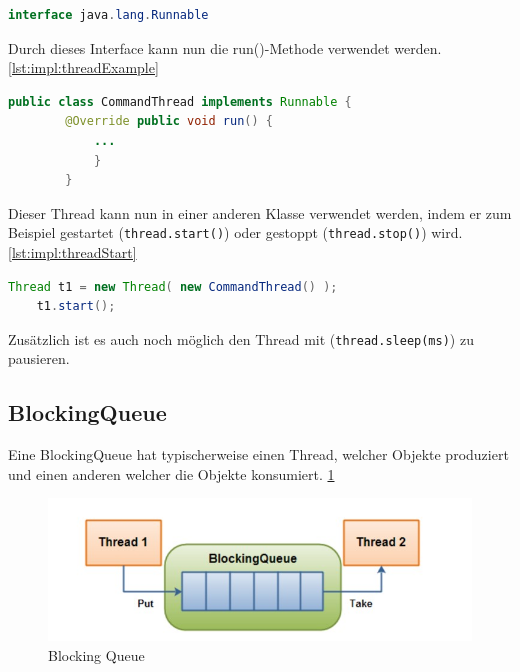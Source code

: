 \begin{lstlisting}[language=java,caption=Java Runnable,label=lst:impl:javaRunnable]
    interface java.lang.Runnable
\end{lstlisting}

Durch dieses Interface kann nun die run()-Methode verwendet werden. \ref{lst:impl:threadExample}

\begin{lstlisting}[language=java,caption=Einfaches Thread Beispiel,label=lst:impl:threadExample]
    public class CommandThread implements Runnable {  
        @Override public void run() {    
            ...
            }
        }
\end{lstlisting}

Dieser Thread kann nun in einer anderen Klasse verwendet werden, indem er zum Beispiel gestartet (\texttt{thread.start()}) oder gestoppt (\texttt{thread.stop()}) wird. \ref{lst:impl:threadStart}

\begin{lstlisting}[language=java,caption=Thread erstellen/starten,label=lst:impl:threadStart]
    Thread t1 = new Thread( new CommandThread() );
    t1.start();
\end{lstlisting}

Zusätzlich ist es auch noch möglich den Thread mit (\texttt{thread.sleep(ms)}) zu pausieren.

\subsection{BlockingQueue}

Eine BlockingQueue hat typischerweise einen Thread, welcher Objekte produziert und einen anderen welcher die Objekte konsumiert. \ref{fig:impl:BlockingQueue}

\begin{figure}
    \centering
    \includegraphics[scale=0.5]{pics/blockingQueue.jpg}
    \caption{Blocking Queue}
    \label{fig:impl:BlockingQueue}
\end{figure}


